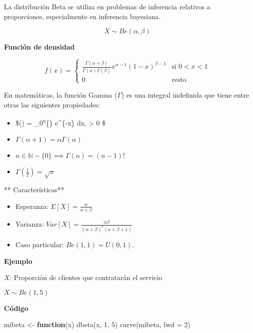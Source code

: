 \documentclass[
]{article}
\newenvironment{Shaded}{\begin{snugshade}}{\end{snugshade}}
\newcommand{\AttributeTok}[1]{\textcolor[rgb]{0.77,0.63,0.00}{#1}}
\newcommand{\ControlFlowTok}[1]{\textcolor[rgb]{0.13,0.29,0.53}{\textbf{#1}}}
\newcommand{\DecValTok}[1]{\textcolor[rgb]{0.00,0.00,0.81}{#1}}
\newcommand{\FunctionTok}[1]{\textcolor[rgb]{0.00,0.00,0.00}{#1}}
\newcommand{\NormalTok}[1]{#1}
\newcommand{\OtherTok}[1]{\textcolor[rgb]{0.56,0.35,0.01}{#1}}
\providecommand{\tightlist}{%
  \setlength{\itemsep}{0pt}\setlength{\parskip}{0pt}}
\begin{document}
La distribución Beta se utiliza en problemas de inferencia relativos a
proporciones, especialmente en inferencia bayesiana.

\[X \sim \mathit{Be}(\alpha, \beta)\]

\textbf{Función de densidad}

\[f(x) = 
\begin{cases}
\frac{\Gamma(\alpha + \beta)}{\Gamma(\alpha)\Gamma(\beta)}x^{\alpha-1}(1-x)^{\beta -1} & \text{si } 0 < x < 1\\
0 & \text{resto } 
\end{cases}\]

En matemáticas, la función Gamma (\(\Gamma\)) es una integral indefinida
que tiene entre otras las siguientes propiedades:

\begin{itemize}
\tightlist
\item
  \$\Gamma(\alpha) = \int\_0\textsuperscript{\infty x}\{\}
  e\^{}\{-x\} dx, \qquad \alpha \textgreater{} 0 \$
\item
  \(\Gamma(\alpha + 1) = \alpha \Gamma(\alpha)\)
\item
  \(n \in \mathbb{N}-\{0\} \implies \Gamma(n) = (n-1)!\)
\item
  \(\Gamma(\frac{1}{2}) = \sqrt{\pi}\)
\end{itemize}

** Características**

\begin{itemize}
\tightlist
\item
  Esperanza: \(E[X] = \frac{\alpha}{\alpha + \beta}\)
\item
  Varianza:
  \(\mathit{Var}[X] = \frac{\alpha\beta}{(\alpha + \beta)^2(\alpha + \beta+1)}\)
\item
  Caso particular: \(\mathit{Be}(1,1) = U(0,1)\).
\end{itemize}

\textbf{Ejemplo}

\(X\): Proporción de clientes que contratarán el servicio

\(X\sim \mathit{Be}(1, 5)\)

\textbf{Código}

\begin{Shaded}
\begin{Highlighting}[]
\NormalTok{mibeta }\OtherTok{\textless{}{-}} \ControlFlowTok{function}\NormalTok{(x) }\FunctionTok{dbeta}\NormalTok{(x, }\DecValTok{1}\NormalTok{, }\DecValTok{5}\NormalTok{)}
\FunctionTok{curve}\NormalTok{(mibeta, }\AttributeTok{lwd =} \DecValTok{2}\NormalTok{)}
\end{Highlighting}
\end{Shaded}
\end{document}
